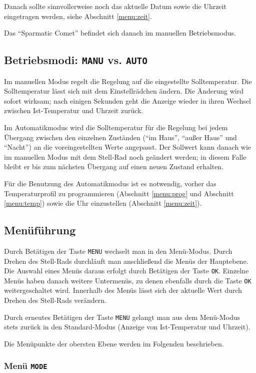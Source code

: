 \documentclass[a5paper,twoside]{article}
\newcommand\SC{"`Sparmatic Comet"'}
\begin{document}
Danach sollte sinnvollerweise noch das aktuelle Datum sowie die
Uhrzeit eingetragen werden, siehe Abschnitt \ref{menu:zeit}.

Das \SC{} befindet sich danach im manuellen Betriebsmodus.

\subsection {
  Betriebsmodi: \texttt{MANU} vs. \texttt{AUTO}\label{sec:modi}
}

Im manuellen Modus regelt die Regelung auf die eingestellte Solltemperatur.
Die Solltemperatur lässt sich mit dem Einstellrädchen ändern.  Die
Änderung wird sofort wirksam; nach einigen Sekunden geht die Anzeige
wieder in ihren Wechsel zwischen Ist-Temperatur und Uhrzeit zurück.

Im Automatikmodus wird die Solltemperatur für die Regelung bei jedem
Übergang zwischen den einzelnen Zuständen ("`im Haus"', "`außer Haus"'
und "`Nacht"') an die voreingestellten Werte angepasst.  Der Sollwert
kann danach wie im manuellen Modus mit dem Stell-Rad noch geändert
werden; in diesem Falle bleibt er bis zum nächsten Übergang auf einen
neuen Zustand erhalten.

Für die Benutzung des Automatikmodus ist es notwendig, vorher das
Temperaturprofil zu programmieren (Abschnitt \ref{menu:prog} und
Abschnitt \ref{menu:temp}) sowie die Uhr einzustellen (Abschnitt
\ref{menu:zeit}).

\subsection {
  Menüführung
}

Durch Betätigen der Taste \texttt{MENU} wechselt man in den
Menü-Modus.  Durch Drehen des Stell-Rads durchläuft man anschließend
die Menüs der Hauptebene.  Die Auswahl eines Menüs daraus erfolgt
durch Betätigen der Taste \texttt{OK}.  Einzelne Menüs haben danach
weitere Untermenüs, zu denen ebenfalls durch die Taste \texttt{OK}
weitergeschaltet wird.  Innerhalb des Menüs lässt sich der aktuelle
Wert durch Drehen des Stell-Rads verändern.

Durch erneutes Betätigen der Taste \texttt{MENU} gelangt man aus dem
Menü-Modus stets zurück in den Standard-Modus (Anzeige von
Ist-Temperatur und Uhrzeit).

Die Menüpunkte der obersten Ebene werden im Folgenden beschrieben.

\subsubsection {
  Menü \texttt{MODE}
}
\end{document}
